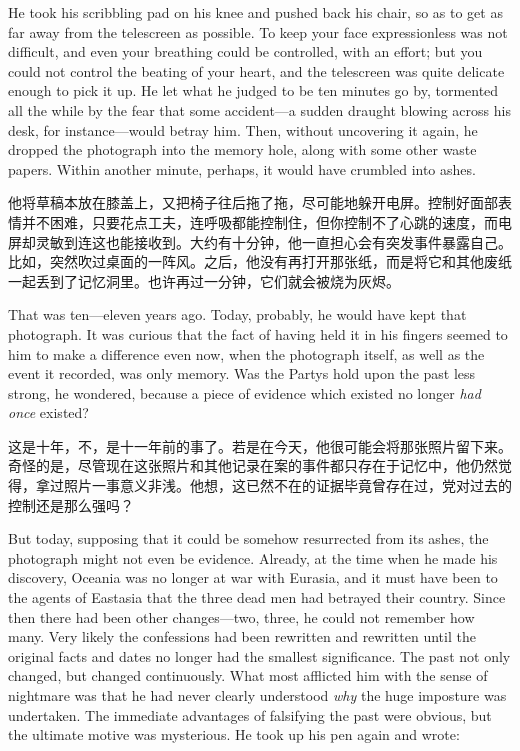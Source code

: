 \begin{paracol}{2}
He took his scribbling pad on his knee and pushed back his chair, so as
to get as far away from the telescreen as possible. To keep your face
expressionless was not difficult, and even your breathing could be
controlled, with an effort; but you could not control the beating of
your heart, and the telescreen was quite delicate enough to pick it up.
He let what he judged to be ten minutes go by, tormented all the while
by the fear that some accident---a sudden draught blowing across his
desk, for instance---would betray him. Then, without uncovering it
again, he dropped the photograph into the memory hole, along with some
other waste papers. Within another minute, perhaps, it would have
crumbled into ashes.

\switchcolumn

他将草稿本放在膝盖上，又把椅子往后拖了拖，尽可能地躲开电屏。控制好面部表情并不困难，只要花点工夫，连呼吸都能控制住，但你控制不了心跳的速度，而电屏却灵敏到连这也能接收到。大约有十分钟，他一直担心会有突发事件暴露自己。比如，突然吹过桌面的一阵风。之后，他没有再打开那张纸，而是将它和其他废纸一起丢到了记忆洞里。也许再过一分钟，它们就会被烧为灰烬。

\switchcolumn*

That was ten---eleven years ago. Today, probably, he would have kept
that photograph. It was curious that the fact of having held it in his
fingers seemed to him to make a difference even now, when the photograph
itself, as well as the event it recorded, was only memory. Was the
Party\textquotesingle s hold upon the past less strong, he wondered,
because a piece of evidence which existed no longer \emph{had once}
existed?

\switchcolumn

这是十年，不，是十一年前的事了。若是在今天，他很可能会将那张照片留下来。奇怪的是，尽管现在这张照片和其他记录在案的事件都只存在于记忆中，他仍然觉得，拿过照片一事意义非浅。他想，这已然不在的证据毕竟曾存在过，党对过去的控制还是那么强吗？

\switchcolumn*

But today, supposing that it could be somehow resurrected from its
ashes, the photograph might not even be evidence. Already, at the time
when he made his discovery, Oceania was no longer at war with Eurasia,
and it must have been to the agents of Eastasia that the three dead men
had betrayed their country. Since then there had been other
changes---two, three, he could not remember how many. Very likely the
confessions had been rewritten and rewritten until the original facts
and dates no longer had the smallest significance. The past not only
changed, but changed continuously. What most afflicted him with the
sense of nightmare was that he had never clearly understood \emph{why}
the huge imposture was undertaken. The immediate advantages of
falsifying the past were obvious, but the ultimate motive was
mysterious. He took up his pen again and wrote:


\end{paracol}
